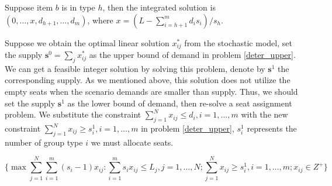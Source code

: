 \begin{lem}
Suppose item $b$ is in type $h$, then the integrated solution is $(0,\ldots, x,d_{h+1}, \ldots, d_{m})$, where $x = (L- \sum_{i = h+1}^{m} {d_i s_i})/ s_h$.  
\end{lem}


  


Suppose we obtain the optimal linear solution $x^{*}_{ij}$ from the stochastic model, set the supply $\mathbf{s}^{0} = \sum_{j} x^{*}_{ij}$ as the upper bound of demand in problem \eqref{deter_upper}. We can get a feasible integer solution by solving this problem, denote by $\mathbf{s}^{1}$ the corresponding supply. As we mentioned above, this solution does not utilize the empty seats when the scenario demands are smaller than supply. Thus, we should set the supply $\mathbf{s}^{1}$ as the lower bound of demand, then re-solve a seat assignment problem. We substitute the constraint $\sum_{j =1}^{N} x_{ij} \leq d_{i}, i=1,\ldots,m$ with the new constraint $\sum_{j =1}^{N} x_{ij} \geq s_{i}^{1}, i=1,\ldots,m$ in problem \eqref{deter_upper}, $s_{i}^{1}$ represents the number of group type $i$ we must allocate seats.

\begin{equation}\label{deter_lower}
\{\max \sum_{j=1}^{N} \sum_{i=1}^{m}(s_i -1)x_{ij}: \sum_{i = 1}^{m} s_i x_{ij} \leq L_{j}, j=1,\ldots,N; \sum_{j =1}^{N} x_{ij} \geq s_{i}^{1}, i=1,\ldots,m; x_{ij} \in Z^{+} \}
\end{equation}


